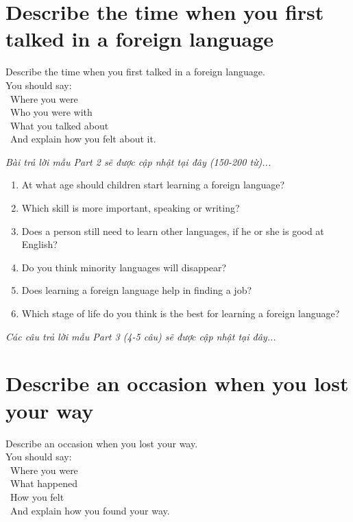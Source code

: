 \section{Describe the time when you first talked in a foreign language}
\begin{ieltsprompt}
Describe the time when you first talked in a foreign language. \\
You should say: \\
\textbullet\ Where you were \\
\textbullet\ Who you were with \\
\textbullet\ What you talked about \\
\textbullet\ And explain how you felt about it. \\
\end{ieltsprompt}

\vspace{1em}
\textit{Bài trả lời mẫu Part 2 sẽ được cập nhật tại đây (150-200 từ)...}
\vspace{2em}

\begin{ieltsprompt}
\begin{enumerate}[itemsep=4pt]
    \item At what age should children start learning a foreign language?
    \item Which skill is more important, speaking or writing?
    \item Does a person still need to learn other languages, if he or she is good at English?
    \item Do you think minority languages will disappear?
    \item Does learning a foreign language help in finding a job?
    \item Which stage of life do you think is the best for learning a foreign language?
\end{enumerate}
\end{ieltsprompt}

\vspace{1em}
\textit{Các câu trả lời mẫu Part 3 (4-5 câu) sẽ được cập nhật tại đây...}
\vspace{2em}

\section{Describe an occasion when you lost your way}
\begin{ieltsprompt}
Describe an occasion when you lost your way. \\
You should say: \\
\textbullet\ Where you were \\
\textbullet\ What happened \\
\textbullet\ How you felt \\
\textbullet\ And explain how you found your way. \\
\end{ieltsprompt}

